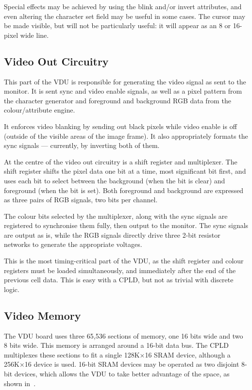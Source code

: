 Special effects may be achieved by using the blink and/or invert attributes,
and even altering the character set field may be useful in some cases. The
cursor may be made visible, but will not be particularly useful: it will appear
as an 8 or 16-pixel wide line.

\subsection{Video Out Circuitry}
\label{sec:vdu:video-out}

This part of the VDU is responsible for generating the video signal as sent to
the monitor. It is sent sync and video enable signals, as well as a pixel
pattern from the character generator and foreground and background RGB data
from the colour/attribute engine.

It enforces video blanking by sending out black pixels while video enable is
off (outside of the visible areas of the image frame). It also appropriately
formats the sync signals — currently, by inverting both of them.

At the centre of the video out circuitry is a shift register and
multiplexer. The shift register shifts the pixel data one bit at a time, most
significant bit first, and uses each bit to select between the background (when
the bit is clear) and foreground (when the bit is set). Both foreground and
background are expressed as three pairs of RGB signals, two bits per
channel.

The colour bits selected by the multiplexer, along with the sync signals are
registered to synchronise them fully, then output to the monitor. The sync
signals are output as is, while the RGB signals directly drive three 2-bit
resistor networks to generate the appropriate voltages.

This is the most timing-critical part of the VDU, as the shift register and
colour registers must be loaded simultaneously, and immediately after the end
of the previous cell data. This is easy with a CPLD, but not as trivial with
discrete logic.



\subsection{Video Memory}
\label{sec:vdu:memory-org}

The VDU board uses three 65,536 sections of memory, one 16 bits wide and two 8
bits wide. This memory is arranged around a 16-bit data bus. The CPLD
multiplexes these sections to fit a single 128K×16 SRAM device, although a
256K×16 device is used. 16-bit SRAM devices may be operated as two disjoint
8-bit devices, which allows the VDU to take better advantage of the space, as
shown in~.

